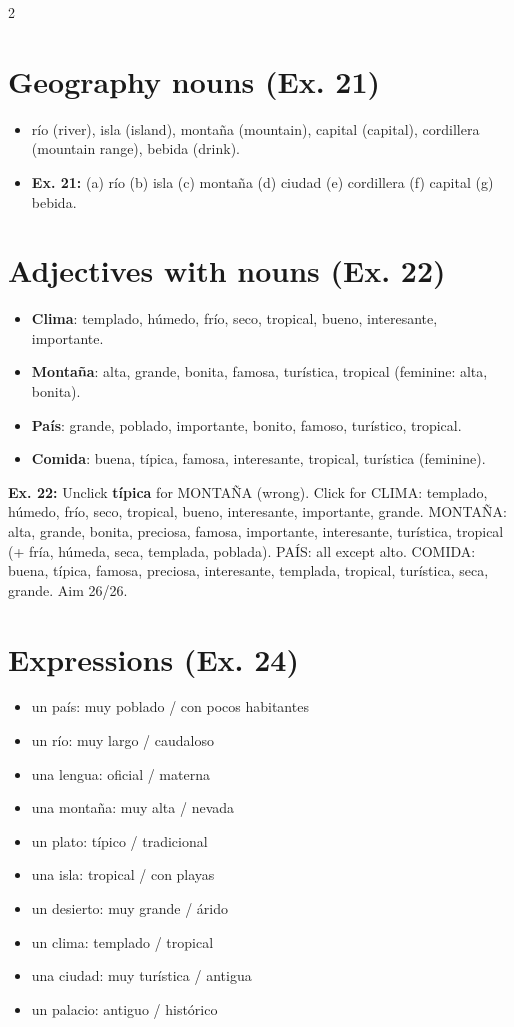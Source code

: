 \documentclass[9pt,a4paper]{article}
\begin{document}
\begin{multicols}{2}
\section*{\color{spanishgreen}Geography nouns (Ex. 21)}
\begin{itemize}
\item r\'io (river), isla (island), monta\~na (mountain), capital (capital), cordillera (mountain range), bebida (drink).
\item \textbf{Ex. 21:} (a) r\'io (b) isla (c) monta\~na (d) ciudad (e) cordillera (f) capital (g) bebida.
\end{itemize}

\section*{\color{spanishgreen}Adjectives with nouns (Ex. 22)}
\begin{itemize}
\item \textbf{Clima}: templado, h\'umedo, fr\'io, seco, tropical, bueno, interesante, importante.
\item \textbf{Monta\~na}: alta, grande, bonita, famosa, tur\'istica, tropical (feminine: alta, bonita).
\item \textbf{Pa\'is}: grande, poblado, importante, bonito, famoso, tur\'istico, tropical.
\item \textbf{Comida}: buena, t\'ipica, famosa, interesante, tropical, tur\'istica (feminine).
\end{itemize}
\textbf{Ex. 22:} Unclick \textbf{t\'ipica} for MONTA\~NA (wrong). Click for CLIMA: templado, h\'umedo, fr\'io, seco, tropical, bueno, interesante, importante, grande. MONTA\~NA: alta, grande, bonita, preciosa, famosa, importante, interesante, tur\'istica, tropical (+ fr\'ia, h\'umeda, seca, templada, poblada). PA\'IS: all except alto. COMIDA: buena, t\'ipica, famosa, preciosa, interesante, templada, tropical, tur\'istica, seca, grande. Aim 26/26.

\section*{\color{spanishgreen}Expressions (Ex. 24)}
\begin{itemize}
\item un pa\'is: muy poblado / con pocos habitantes
\item un r\'io: muy largo / caudaloso
\item una lengua: oficial / materna
\item una monta\~na: muy alta / nevada
\item un plato: t\'ipico / tradicional
\item una isla: tropical / con playas
\item un desierto: muy grande / \'arido
\item un clima: templado / tropical
\item una ciudad: muy tur\'istica / antigua
\item un palacio: antiguo / hist\'orico
\end{itemize}


\end{multicols}
\end{document}

